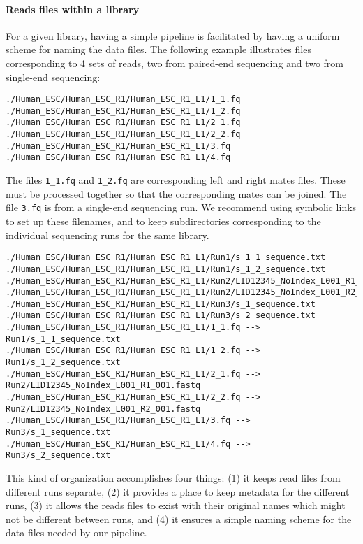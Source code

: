 \documentclass[10pt]{article}
\newcommand{\fn}[1]{\texttt{#1}}
\begin{document}
{{\paragraph{Reads files within a library}
For a given library, having a simple pipeline is facilitated by having
a uniform scheme for naming the data files. The following example
illustrates files corresponding to 4 sets of reads, two from
paired-end sequencing and two from single-end sequencing:
\begin{verbatim}
./Human_ESC/Human_ESC_R1/Human_ESC_R1_L1/1_1.fq
./Human_ESC/Human_ESC_R1/Human_ESC_R1_L1/1_2.fq
./Human_ESC/Human_ESC_R1/Human_ESC_R1_L1/2_1.fq
./Human_ESC/Human_ESC_R1/Human_ESC_R1_L1/2_2.fq
./Human_ESC/Human_ESC_R1/Human_ESC_R1_L1/3.fq
./Human_ESC/Human_ESC_R1/Human_ESC_R1_L1/4.fq
\end{verbatim}
The files \fn{1\_1.fq} and \fn{1\_2.fq} are corresponding left and
right mates files. These must be processed together so that the
corresponding mates can be joined. The file \fn{3.fq} is from a
single-end sequencing run. We recommend using symbolic links to set up
these filenames, and to keep subdirectories corresponding to the
individual sequencing runs for the same library.
\begin{verbatim}
./Human_ESC/Human_ESC_R1/Human_ESC_R1_L1/Run1/s_1_1_sequence.txt
./Human_ESC/Human_ESC_R1/Human_ESC_R1_L1/Run1/s_1_2_sequence.txt
./Human_ESC/Human_ESC_R1/Human_ESC_R1_L1/Run2/LID12345_NoIndex_L001_R1_001.fastq
./Human_ESC/Human_ESC_R1/Human_ESC_R1_L1/Run2/LID12345_NoIndex_L001_R2_001.fastq
./Human_ESC/Human_ESC_R1/Human_ESC_R1_L1/Run3/s_1_sequence.txt
./Human_ESC/Human_ESC_R1/Human_ESC_R1_L1/Run3/s_2_sequence.txt
./Human_ESC/Human_ESC_R1/Human_ESC_R1_L1/1_1.fq --> Run1/s_1_1_sequence.txt
./Human_ESC/Human_ESC_R1/Human_ESC_R1_L1/1_2.fq --> Run1/s_1_2_sequence.txt
./Human_ESC/Human_ESC_R1/Human_ESC_R1_L1/2_1.fq --> Run2/LID12345_NoIndex_L001_R1_001.fastq
./Human_ESC/Human_ESC_R1/Human_ESC_R1_L1/2_2.fq --> Run2/LID12345_NoIndex_L001_R2_001.fastq
./Human_ESC/Human_ESC_R1/Human_ESC_R1_L1/3.fq --> Run3/s_1_sequence.txt
./Human_ESC/Human_ESC_R1/Human_ESC_R1_L1/4.fq --> Run3/s_2_sequence.txt
\end{verbatim}
This kind of organization accomplishes four things: (1) it keeps read
files from different runs separate, (2) it provides a place to keep
metadata for the different runs, (3) it allows the reads files to
exist with their original names which might not be different between
runs, and (4) it ensures a simple naming scheme for the data files
needed by our pipeline.

}}
\end{document}
